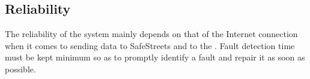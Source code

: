 \documentclass[../../../rasd.tex]{subfiles}
\begin{document}
\subsection{Reliability\label{sect:3.5.1}}

The reliability of the system mainly depends on that of the Internet connection when it comes to sending data to SafeStreets and to the . Fault detection time must be kept minimum so as to promptly identify a fault and repair it as soon as possible. 
\end{document}
